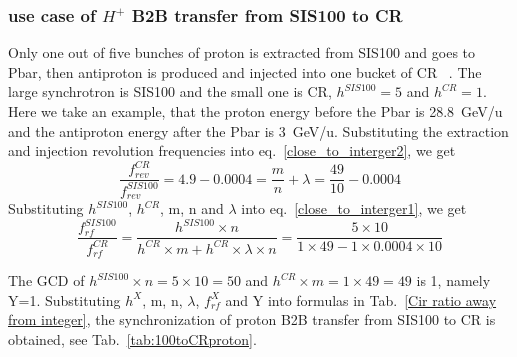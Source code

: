 \subsubsection{use case of $H^{+}$ B2B transfer from SIS100 to CR} 
Only one out of five bunches of proton is extracted from SIS100 and goes to Pbar, then antiproton is produced and  injected into one bucket of CR ~\cite{steck_demonstration_2011}. The large synchrotron is SIS100 and the small one is CR, $h^{SIS100}=5$ and $h^{CR}=1$. Here we take an example, that the proton energy before the Pbar is \SI{28.8}{GeV/\atomicmassunit} and the antiproton energy after the Pbar is \SI{3}{GeV/\atomicmassunit}. Substituting the extraction and injection revolution frequencies into eq.~\ref{close_to_interger2}, we get
\begin{equation} 
\frac{f_{rev}^{CR}}{f_{rev}^{SIS100}}=4.9-0.0004=\frac{m}{n}+ \lambda=\frac{49}{10}-0.0004
\end{equation}
Substituting $h^{SIS100}$, $h^{CR}$, m, n and $\lambda$ into eq.~\ref{close_to_interger1}, we get
\begin{equation} 
\frac{f_{rf}^{SIS100}}{f_{rf}^{CR}}=\frac{h^{SIS100}\times n}{h^{CR} \times m+ h^{CR} \times\lambda\times n}=\frac{5\times 10}{1 \times 49- 1 \times0.0004\times 10}
\end{equation}

The GCD of $h^{SIS100}\times n=5\times10=50$ and $h^{CR} \times m=1\times 49=49$ is 1, namely Y=1. Substituting $h^X$, m, n, $\lambda$, $f_{rf}^{X}$ and Y into formulas in Tab.~\ref{Cir ratio away from integer}, the synchronization of proton B2B transfer from SIS100 to CR is obtained, see Tab.~\ref{tab:100toCRproton}.

